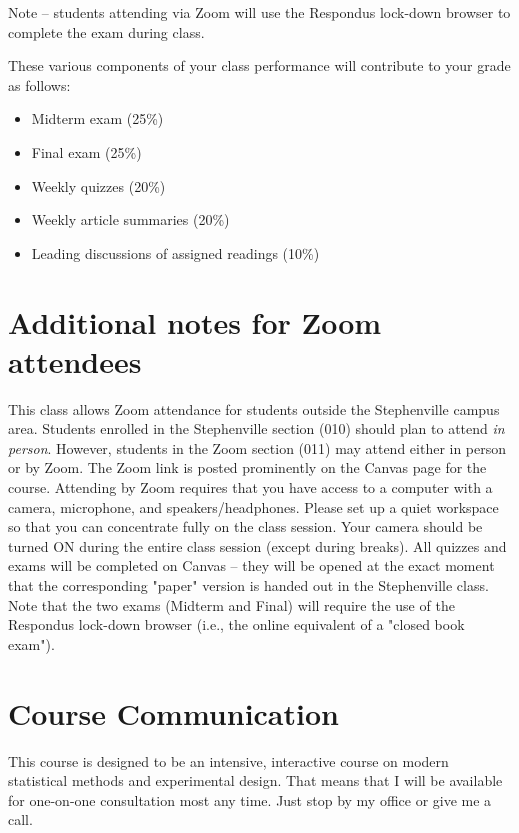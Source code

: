 \documentclass[10pt]{article}
\begin{document}
Note -- students attending via Zoom will use the Respondus lock-down browser to complete the exam during class.

These various components of your class performance will contribute to your grade as follows:

\begin{itemize}
\item Midterm exam (25\%)
\item Final exam (25\%)
\item Weekly quizzes (20\%)
\item Weekly article summaries (20\%)
\item Leading discussions of assigned readings (10\%)
\end{itemize}

\section*{Additional notes for Zoom attendees}
\label{sec:org47a9f5d}

This class allows Zoom attendance for students outside the Stephenville campus area. Students enrolled in the Stephenville section (010) should plan to attend \emph{in person}. However, students in the Zoom section (011) may attend either in person or by Zoom. The Zoom link is posted prominently on the Canvas page for the course. Attending by Zoom requires that you have access to a computer with a camera, microphone, and speakers/headphones. Please set up a quiet workspace so that you can concentrate fully on the class session. Your camera should be turned ON during the entire class session (except during breaks). All quizzes and exams will be completed on Canvas -- they will be opened at the exact moment that the corresponding "paper" version is handed out in the Stephenville class. Note that the two exams (Midterm and Final) will require the use of the Respondus lock-down browser (i.e., the online equivalent of a "closed book exam").

\section*{Course Communication}
\label{sec:orgcf219c2}

This course is designed to be an intensive, interactive course on modern statistical methods and experimental design.  That means that I will be available for one-on-one consultation most any time.  Just stop by my office or give me a call.
\end{document}
